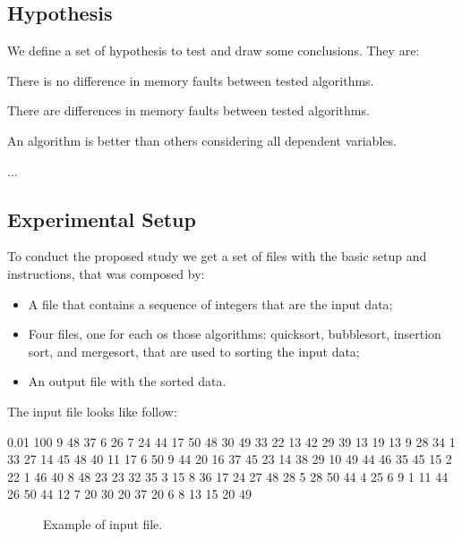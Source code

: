 \subsection{Hypothesis}

We define a set of hypothesis to test and draw some conclusions. They are:

\setcounter{hyp}{-1}
\begin{hyp} \label{hyp:a}There is no difference in memory faults between tested algorithms.\end{hyp}
\begin{hyp} \label{hyp:b}There are differences in memory faults between tested algorithms. \end{hyp}
\begin{hyp} \label{hyp:c} An algorithm is better than others considering all dependent variables. \end{hyp}

\begin{hyp} \label{hyp:d} ... \end{hyp}

\subsection{Experimental Setup}

To conduct the proposed study we get a set of files with the basic setup and instructions, that was composed by:
\begin{itemize}
    \item A file that contains a sequence of integers that are the input data;
    \item Four files, one for each os those algorithms: quicksort, bubblesort, insertion sort, and mergesort, that are used to sorting the input data;
    \item An output file with the sorted data.
\end{itemize}

The input file looks like follow:

\begin{verbbox}[\mbox{}]
0.01 100 9 48 37 6 26 7 24 44 17 50 48 30 49 33 22 13 42 29 39 13 19 13 9 28 
34 1 33 27 14 45 48 40 11 17 6 50 9 44 20 16 37 45 23 14 38 29 10 49 44 46 35
45 15 2 22 1 46 40 8 48 23 23 32 35 3 15 8 36 17 24 27 48 28 5 28 50 44 4 25 
6 9 1 11 44 26 50 44 12 7 20 30 20 37 20 6 8 13 15 20 49
\end{verbbox}

\begin{figure}[hbtp]
    \centering
    \fbox{
    \theverbbox
    }
    \caption{Example of input file.}
    \label{input-file-example}
\end{figure}

